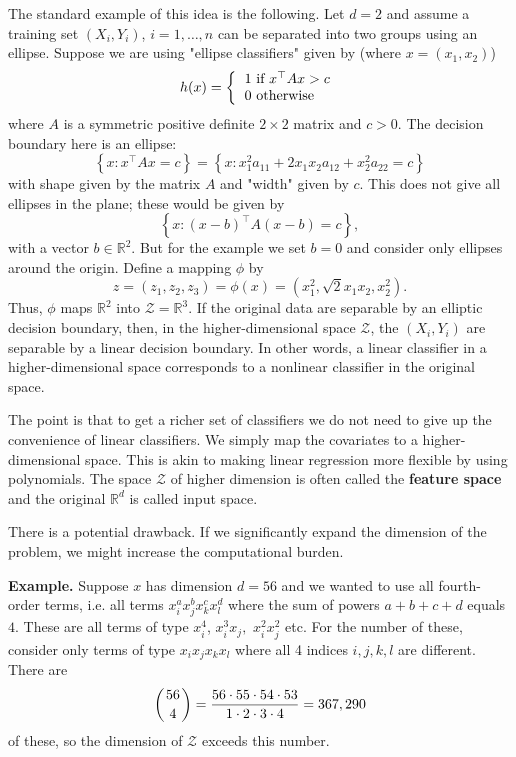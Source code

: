 \documentclass[11pt,twoside]{article}%
\theoremstyle{change}
\begin{document}
The standard example of this idea is the following. Let $d=2$ and assume a
training set $(X_{i},Y_{i})$, $i=1,\ldots,n$ can be separated into two groups
using an ellipse. Suppose we are using "ellipse classifiers" given by (where
$x=(x_{1},x_{2})$)%
\[
h(x)=\left\{
\begin{tabular}
[c]{l}%
$1$ if $x^{\top}Ax>c$\\
$0$ otherwise
\end{tabular}
\right.
\]
where $A$ is a symmetric positive definite $2\times2$ matrix and $c>0$. The
decision boundary here is an ellipse:%
\[
\left\{  x:x^{\top}Ax=c\right\}  =\left\{  x:x_{1}^{2}a_{11}+2x_{1}x_{2}%
a_{12}+x_{2}^{2}a_{22}=c\right\}
\]
with shape given by the matrix $A$ and "width" given by $c$. This does not
give all ellipses in the plane; these would be given by
\[
\left\{  x:(x-b)^{\top}A(x-b)=c\right\}  ,
\]
with a vector $b\in\mathbb{R}^{2}$. But for the example we set $b=0$ and
consider only ellipses around the origin. Define a mapping $\phi$ by
\[
z=(z_{1},z_{2},z_{3})=\phi(x)=(x_{1}^{2},\sqrt{2}x_{1}x_{2},x_{2}^{2}).
\]
Thus, $\phi$ maps $\mathbb{R}^{2}$ into $\mathcal{Z}=\mathbb{R}^{3}$. If the
original data are separable by an elliptic decision boundary, then, in the
higher-dimensional space $\mathcal{Z}$, the $(X_{i},Y_{i})$ are separable by a
linear decision boundary. In other words, a linear classifier in a
higher-dimensional space corresponds to a nonlinear classifier in the original space.

The point is that to get a richer set of classifiers we do not need to give up
the convenience of linear classifiers. We simply map the covariates to a
higher-dimensional space. This is akin to making linear regression more
flexible by using polynomials. The space $\mathcal{Z}$ of higher dimension is
often called the \textbf{feature space} and the original $\mathbb{R}^{d}$ is
called input space.

There is a potential drawback. If we significantly expand the dimension of the
problem, we might increase the computational burden.

\bigskip

\textbf{Example. } Suppose $x$ has dimension $d=56$ and we wanted to use all
fourth-order terms, i.e. all terms $x_{i}^{a}x_{j}^{b}x_{k}^{c}x_{l}^{d}$
where the sum of powers $a+b+c+d$ equals $4$. These are all terms of type
$x_{i}^{4}$, $x_{i}^{3}x_{j},$ $x_{i}^{2}x_{j}^{2}$ etc. For the number of
these, consider only terms of type $x_{i}x_{j}x_{k}x_{l}$ where all 4 indices
$i,j,k,l$ are different. There are
\[
\left(
\genfrac{}{}{0pt}{}{56}{4}%
\right)  =\frac{56\cdot55\cdot54\cdot53}{1\cdot2\cdot3\cdot4}=367,290
\]
of these, so the dimension of $\mathcal{Z}$ exceeds this number.
\end{document}

